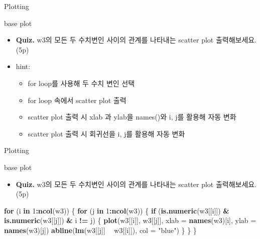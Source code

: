 \documentclass[ignorenonframetext,]{beamer}
\newenvironment{Shaded}{\begin{snugshade}}{\end{snugshade}}
\newcommand{\KeywordTok}[1]{\textcolor[rgb]{0.13,0.29,0.53}{\textbf{#1}}}
\newcommand{\DataTypeTok}[1]{\textcolor[rgb]{0.13,0.29,0.53}{#1}}
\newcommand{\DecValTok}[1]{\textcolor[rgb]{0.00,0.00,0.81}{#1}}
\newcommand{\StringTok}[1]{\textcolor[rgb]{0.31,0.60,0.02}{#1}}
\newcommand{\ControlFlowTok}[1]{\textcolor[rgb]{0.13,0.29,0.53}{\textbf{#1}}}
\newcommand{\OperatorTok}[1]{\textcolor[rgb]{0.81,0.36,0.00}{\textbf{#1}}}
\newcommand{\NormalTok}[1]{#1}
\providecommand{\tightlist}{%
  \setlength{\itemsep}{0pt}\setlength{\parskip}{0pt}}
\begin{document}
\begin{frame}{Plotting}

\begin{block}{base plot}

\begin{itemize}
\item
  \textbf{Quiz.} w3의 모든 두 수치변인 사이의 관계를 나타내는 scatter
  plot 출력해보세요. (5p)
\item
  hint:

  \begin{itemize}
  \item
    for loop를 사용해 두 수치 변인 선택
  \item
    for loop 속에서 scatter plot 출력
  \item
    scatter plot 출력 시 xlab 과 ylab을 names()와 i, j를 활용해 자동
    변화
  \item
    scatter plot 출력 시 회귀선을 i, j를 활용해 자동 변화
  \end{itemize}
\end{itemize}

\end{block}

\end{frame}

\begin{frame}[fragile]{Plotting}

\begin{block}{base plot}

\begin{itemize}
\tightlist
\item
  \textbf{Quiz.} w3의 모든 두 수치변인 사이의 관계를 나타내는 scatter
  plot 출력해보세요. (5p)
\end{itemize}

\begin{Shaded}
\begin{Highlighting}[]
\ControlFlowTok{for}\NormalTok{ (i }\ControlFlowTok{in} \DecValTok{1}\OperatorTok{:}\KeywordTok{ncol}\NormalTok{(w3)) \{}
    \ControlFlowTok{for}\NormalTok{ (j }\ControlFlowTok{in} \DecValTok{1}\OperatorTok{:}\KeywordTok{ncol}\NormalTok{(w3)) \{}
        \ControlFlowTok{if}\NormalTok{ (}\KeywordTok{is.numeric}\NormalTok{(w3[[i]]) }\OperatorTok{&}\StringTok{ }\KeywordTok{is.numeric}\NormalTok{(w3[[j]]) }\OperatorTok{&}\StringTok{ }\NormalTok{i }\OperatorTok{!=}\StringTok{ }\NormalTok{j) \{}
        \KeywordTok{plot}\NormalTok{(w3[[i]],}
\NormalTok{        w3[[j]],}
        \DataTypeTok{xlab =} \KeywordTok{names}\NormalTok{(w3)[i],}
        \DataTypeTok{ylab =} \KeywordTok{names}\NormalTok{(w3)[j])}
        \KeywordTok{abline}\NormalTok{(}\KeywordTok{lm}\NormalTok{(w3[[j]] }\OperatorTok{~}\StringTok{ }\NormalTok{w3[[i]]), }\DataTypeTok{col =} \StringTok{"blue"}\NormalTok{)}
\NormalTok{        \}}
\NormalTok{    \}}
\NormalTok{\}}
\end{Highlighting}
\end{Shaded}

\end{block}

\end{frame}
\end{document}
